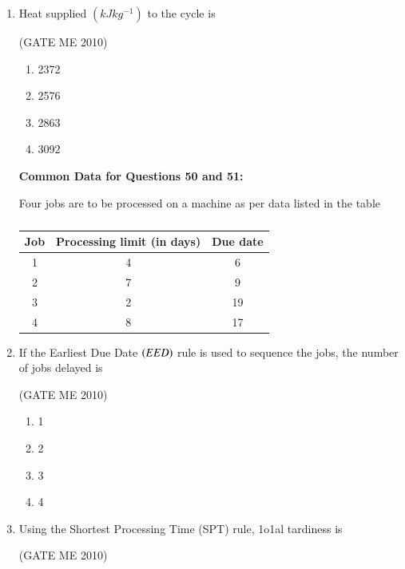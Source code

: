 \documentclass[journal,12pt,onecolumn]{IEEEtran}
\theoremstyle{remark}
\begin{document}
\begin{enumerate}
\item Heat supplied $(kJkg^{-1})$ to the cycle is

\hfill{(GATE  ME 2010)}\\


\begin{multicols}{4}
\begin{enumerate}
\item 2372
\item 2576
\item 2863
\item 3092
\end{enumerate}
\end{multicols}



\textbf{Common Data for Questions 50 and 51:}

Four jobs are to be processed on a machine as per data listed in the table
\begin{table}[h!]
  \centering
  \begin{tabular}{|c|c|c|}
    \hline
    \textbf{Job} & \textbf{Processing limit (in days)} & \textbf{Due date} \\
    \hline
    1 & 4 & 6 \\
    \hline
    2 & 7 & 9 \\
    \hline
    3 & 2 & 19 \\
    \hline
    4 & 8 & 17 \\
    \hline
  \end{tabular}
  \caption*{}
  \label{tab:jobs}
\end{table}

\item If the Earliest Due Date $\left(EED\right)$ rule is used to sequence the jobs, the number of jobs delayed is


\hfill{(GATE  ME 2010)}\\


\begin{multicols}{4}
\begin{enumerate}
\item 1
\item 2
\item 3
\item 4
\end{enumerate}
\end{multicols}


\item Using the Shortest Processing Time (SPT) rule, 1o1al tardiness is

\hfill{(GATE  ME 2010)}\\


\end{enumerate}
\end{document}
